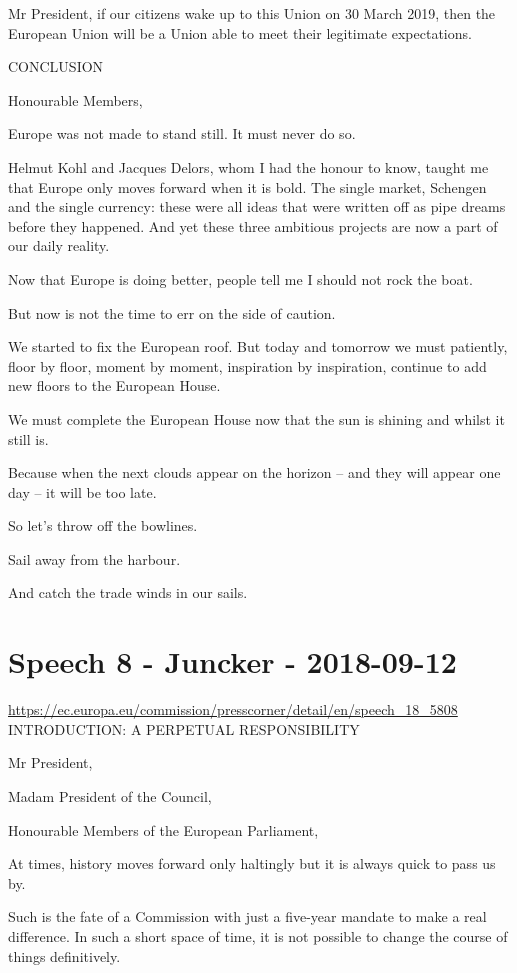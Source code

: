 \documentclass[a4paper,11pt]{article}
\begin{document}
Mr President, if our citizens wake up to this Union on 30 March 2019, then the European Union will be a Union able to meet their legitimate expectations.

 

 

CONCLUSION

Honourable Members,

Europe was not made to stand still. It must never do so.

Helmut Kohl and Jacques Delors, whom I had the honour to know, taught me that Europe only moves forward when it is bold. The single market, Schengen and the single currency: these were all ideas that were written off as pipe dreams before they happened. And yet these three ambitious projects are now a part of our daily reality.

Now that Europe is doing better, people tell me I should not rock the boat.

But now is not the time to err on the side of caution.

We started to fix the European roof. But today and tomorrow we must patiently, floor by floor, moment by moment, inspiration by inspiration, continue to add new floors to the European House.

We must complete the European House now that the sun is shining and whilst it still is.

Because when the next clouds appear on the horizon – and they will appear one day – it will be too late.

So let's throw off the bowlines.

Sail away from the harbour.

And catch the trade winds in our sails.
 \newpage\section{Speech 8 - Juncker - 2018-09-12}
\url{https://ec.europa.eu/commission/presscorner/detail/en/speech_18_5808}\\[3mm]
INTRODUCTION: A PERPETUAL RESPONSIBILITY

 

Mr President,

Madam President of the Council,

Honourable Members of the European Parliament,

At times, history moves forward only haltingly but it is always quick to pass us by.

Such is the fate of a Commission with just a five-year mandate to make a real difference. In such a short space of time, it is not possible to change the course of things definitively.
\end{document}
